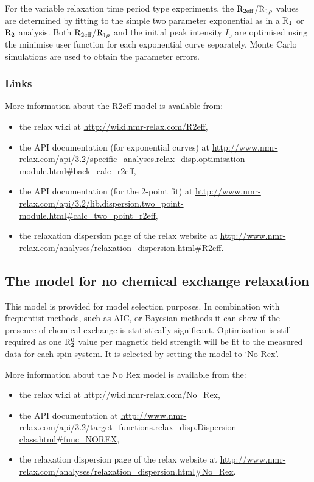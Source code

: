 For the variable relaxation time period type experiments, the $\mathrm{R}_{\textrm{2eff}}$/$\mathrm{R}_{1\rho}$ values are determined by fitting to the simple two parameter exponential as in a $\mathrm{R}_1$ or $\mathrm{R}_2$ analysis.
Both $\mathrm{R}_{\textrm{2eff}}$/$\mathrm{R}_{1\rho}$ and the initial peak intensity $I_0$ are optimised using the minimise user function for each exponential curve separately.
Monte Carlo simulations are used to obtain the parameter errors.


\subsubsection{Links}

More information about the R2eff model is available from:
\begin{itemize}
  \item the relax wiki at \url{http://wiki.nmr-relax.com/R2eff},
  \item the API documentation (for exponential curves) at \url{http://www.nmr-relax.com/api/3.2/specific\_analyses.relax\_disp.optimisation-module.html#back\_calc\_r2eff},
  \item the API documentation (for the 2-point fit) at \url{http://www.nmr-relax.com/api/3.2/lib.dispersion.two\_point-module.html#calc\_two\_point\_r2eff},
  \item the relaxation dispersion page of the relax website at \url{http://www.nmr-relax.com/analyses/relaxation\_dispersion.html#R2eff}.
\end{itemize}



\subsection{The model for no chemical exchange relaxation}
\label{sect: dispersion: No Rex model}

This model is provided for model selection purposes.
In combination with frequentist methods, such as AIC, or Bayesian methods it can show if the presence of chemical exchange is statistically significant.
Optimisation is still required as one $\mathrm{R}_2^0$ value per magnetic field strength will be fit to the measured data for each spin system.
It is selected by setting the model to `No Rex'.

More information about the No Rex model is available from the:
\begin{itemize}
  \item the relax wiki at \url{http://wiki.nmr-relax.com/No\_Rex},
  \item the API documentation at \url{http://www.nmr-relax.com/api/3.2/target\_functions.relax\_disp.Dispersion-class.html#func\_NOREX},
  \item the relaxation dispersion page of the relax website at \url{http://www.nmr-relax.com/analyses/relaxation\_dispersion.html#No\_Rex}.
\end{itemize}



